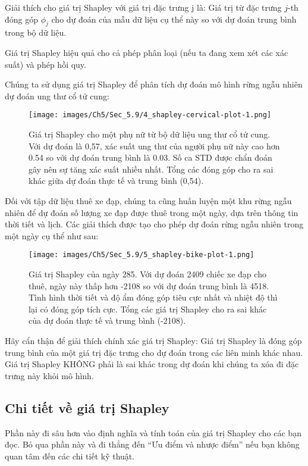 Giải thích cho giá trị Shapley với giá trị đặc trưng j là: Giá trị từ đặc trưng $j$-th đóng góp $\phi_j$ cho dự đoán của mẫu dữ liệu cụ thể này so với dự đoán trung bình trong bộ dữ liệu. 

Giá trị Shapley hiệu quả cho cả phép phân loại (nếu ta đang xem xét các xác suất) và phép hồi quy.

Chúng ta sử dụng giá trị Shapley để phân tích dự đoán mô hình rừng ngẫu nhiên dự đoán ung thư cổ tử cung:

\begin{figure*}[h!]
	\centering
	\texttt{[image: images/Ch5/Sec\_5.9/4\_shapley-cervical-plot-1.png]}
	\label{fig:5_46}
	\caption{ Giá trị Shapley cho một phụ nữ từ bộ dữ liệu ung thư cổ tử cung. Với dự đoán là 0,57, xác suất ung thư của người phụ nữ này cao hơn 0.54 so với dự đoán trung bình là 0.03. Số ca STD được chẩn đoán gây nên sự tăng xác suất nhiều nhất. Tổng các đóng góp cho ra sai khác giữa dự đoán thực tế và trung bình (0,54).}
\end{figure*}

Đối với tập dữ liệu thuê xe đạp, chúng ta cũng huấn luyện một khu rừng ngẫu nhiên để dự đoán số lượng xe đạp được thuê trong một ngày, dựa trên thông tin thời tiết và lịch. Các giải thích được tạo cho phép dự đoán rừng ngẫu nhiên trong một ngày cụ thể như sau:


\begin{figure*}[h!]
	\centering
	\texttt{[image: images/Ch5/Sec\_5.9/5\_shapley-bike-plot-1.png]}
	\label{fig:5_47}
	\caption{ Giá trị Shapley của ngày 285. Với dự đoán 2409 chiếc xe đạp cho thuê, ngày này thấp hơn -2108 so với dự đoán trung bình là 4518. Tình hình thời tiết và độ ẩm đóng góp tiêu cực nhất và nhiệt độ thì lại có đóng góp tích cực. Tổng các giá trị Shapley cho ra sai khác của dự đoán thực tế và trung bình (-2108).}
\end{figure*}

Hãy cẩn thận để giải thích chính xác giá trị Shapley: Giá trị Shapley là đóng góp trung bình của một giá trị đặc trưng cho dự đoán trong các liên minh khác nhau. Giá trị Shapley KHÔNG phải là sai khác trong dự đoán khi chúng ta xóa đi đặc trưng này khỏi mô hình.


\subsection{ Chi tiết về giá trị Shapley}
Phần này đi sâu hơn vào định nghĩa và tính toán của giá trị Shapley cho các bạn đọc. Bỏ qua phần này và đi thẳng đến ``Ưu điểm và nhược điểm'' nếu bạn không quan tâm đến các chi tiết kỹ thuật.


